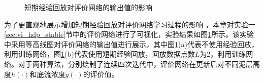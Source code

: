 

\begin{figure}[!tbp]
\centering 
{}
\caption{短期经验回放对评价网络的输出值的影响 }
\label{fig:replay_compare}
\end{figure}
为了更直观地展示增加短期经验回放对评价网络学习过程的影响
，本章对实验一\ref{sec:vi_hdp_stable}节中的评价网络进行了可视化，实验结果如图\ref{fig:replay_compare}所示。该实验中采用等高线图对评价网络的输出值进行展示，其中图\ref{fig:replay_compare}(a)代表不使用经验回放，利用训练网络，图\ref{fig:replay_compare}(b)代表使用短期经验回放，回放数据点数$L$为2，利用训练网络。对于两种算法，分别绘制了连续四次迭代中，评价网络在更新后对不同泥层高度$h(\cdot)$和底流浓度$y(\cdot)$的评价值。
